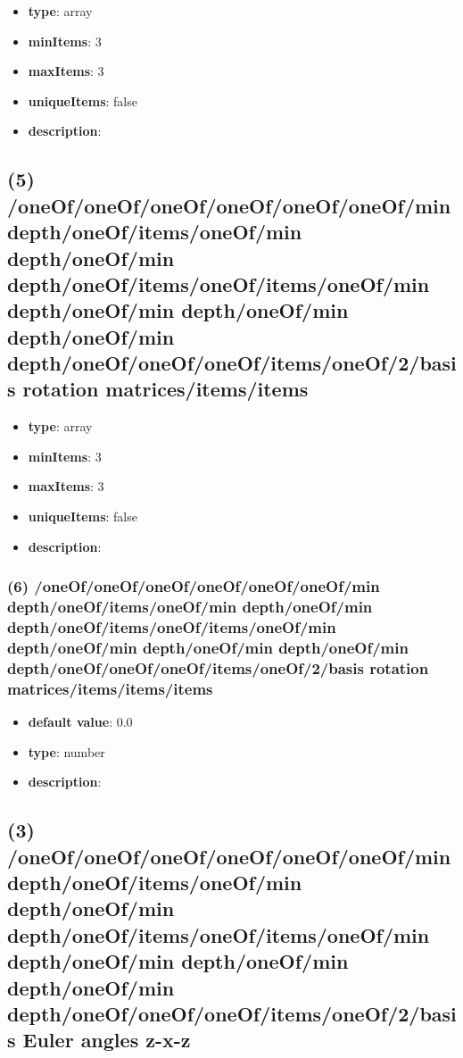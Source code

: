 \begin{itemize}[leftmargin=4em]\item {\bf type}: array
\item {\bf minItems}: 3
\item {\bf maxItems}: 3
\item {\bf uniqueItems}: false
\item {\bf description}: 
\end{itemize}\subsection{(5) /oneOf/oneOf/oneOf/oneOf/oneOf/oneOf/min depth/oneOf/items/oneOf/min depth/oneOf/min depth/oneOf/items/oneOf/items/oneOf/min depth/oneOf/min depth/oneOf/min depth/oneOf/min depth/oneOf/oneOf/oneOf/items/oneOf/2/basis rotation matrices/items/items}
\begin{itemize}[leftmargin=5em]\item {\bf type}: array
\item {\bf minItems}: 3
\item {\bf maxItems}: 3
\item {\bf uniqueItems}: false
\item {\bf description}: 
\end{itemize}\subsubsection{(6) /oneOf/oneOf/oneOf/oneOf/oneOf/oneOf/min depth/oneOf/items/oneOf/min depth/oneOf/min depth/oneOf/items/oneOf/items/oneOf/min depth/oneOf/min depth/oneOf/min depth/oneOf/min depth/oneOf/oneOf/oneOf/items/oneOf/2/basis rotation matrices/items/items/items}
\begin{itemize}[leftmargin=6em]\item {\bf default value}: 0.0
\item {\bf type}: number
\item {\bf description}: 
\end{itemize}\subsection{(3) /oneOf/oneOf/oneOf/oneOf/oneOf/oneOf/min depth/oneOf/items/oneOf/min depth/oneOf/min depth/oneOf/items/oneOf/items/oneOf/min depth/oneOf/min depth/oneOf/min depth/oneOf/min depth/oneOf/oneOf/oneOf/items/oneOf/2/basis Euler angles z-x-z}
